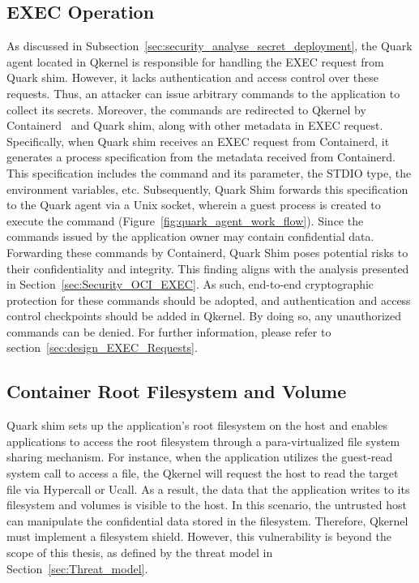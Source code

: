 \subsection{EXEC Operation}
As discussed in Subsection~\ref{sec:security_analyse_secret_deployment}, the Quark agent located in Qkernel is responsible for handling the EXEC request from Quark shim. However, it lacks authentication and access control over these requests. Thus, an attacker can issue arbitrary commands to the application to collect its secrets. Moreover, the commands are 
redirected to Qkernel by Containerd~\cite*{containerd} and Quark shim, along with other metadata in EXEC request. Specifically, when Quark shim receives an EXEC request from Containerd, it generates a process specification from the metadata received from Containerd. This specification includes the command and its parameter, the STDIO type, the environment 
variables, etc. Subsequently, Quark Shim forwards this specification to the Quark agent via a Unix socket, wherein a guest process is created to execute the command (Figure~\ref{fig:quark_agent_work_flow}). Since the commands issued by the application owner may contain confidential data. Forwarding these commands by Containerd, Quark Shim poses potential risks 
to their confidentiality and integrity. This finding aligns with the analysis presented in Section~\ref{sec:Security_OCI_EXEC}. As such, end-to-end cryptographic protection for these commands should be adopted, and authentication and access control checkpoints should be added in Qkernel. By doing so, any unauthorized commands can be denied. For further information, 
please refer to section~\ref{sec:design_EXEC_Requests}.


\subsection{Container Root Filesystem and Volume}
Quark shim sets up the application's root filesystem on the host and enables applications to access the root filesystem through a para-virtualized file system sharing mechanism. For instance, when the application utilizes the guest-read system call to access a file, the Qkernel will request the host to read the target file via Hypercall or Ucall. As a result, the 
data that the application writes to its filesystem and volumes is visible to the host. In this scenario, the untrusted host can manipulate the confidential data stored in the filesystem. Therefore, Qkernel must implement a filesystem shield. However, this vulnerability is beyond the scope of this thesis, as defined by the threat model in 
Section~\ref{sec:Threat_model}.

